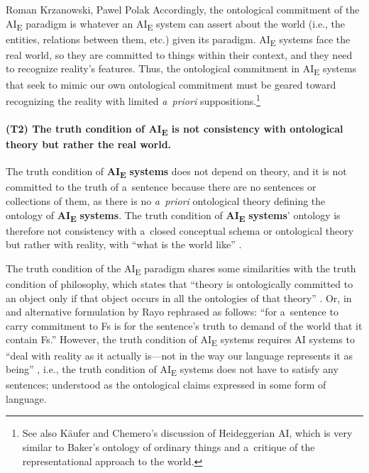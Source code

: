 \begin{artengenv2auth}{Roman Krzanowski, Pawel Polak}
Accordingly, the ontological commitment of the AI\textsubscript{E} paradigm is whatever an AI\textsubscript{E} system can assert about the world (i.e., the entities, relations between them, etc.) given its paradigm. AI\textsubscript{E} systems face the real world, so they are committed to things within their context, and they need to recognize reality's features. Thus, the ontological commitment in AI\textsubscript{E} systems that seek to mimic our own ontological commitment must be geared toward recognizing the reality with limited \textit{a~priori} suppositions.\footnote{See also Käufer and Chemero's
\parencite*[][p.220]{kaufer_phenomenology_2021} %
 discussion of Heideggerian AI, which is very similar to Baker's ontology of ordinary things 
\parencite[][]{baker_metaphysics_2007} %
 and a~critique of the representational approach to the world.}

\paragraph{(T2) The truth condition of AI\textsubscript{E} is not consistency with ontological theory but rather the real world.}
The truth condition of \textbf{AI}\textbf{\textsubscript{E}} \textbf{systems} does not depend on theory, and it is not committed to the truth of a~sentence because there are no sentences or collections of them, as there is no \textit{a~priori} ontological theory defining the ontology of \textbf{AI}\textbf{\textsubscript{E}} \textbf{systems}. The truth condition of \textbf{AI}\textbf{\textsubscript{E}} \textbf{systems}' ontology is therefore not consistency with a~closed conceptual schema or ontological theory but rather with reality, with ``what is the world like''
\parencite[][p.57]{smith_promise_2019}.%


The truth condition of the AI\textsubscript{E} paradigm shares some similarities with the truth condition of philosophy, which states that ``theory is ontologically committed to an object only if that object occurs in all the ontologies of that theory''
\parencite[][p.631]{gibson_ontological_2009}. %
 Or, in and alternative formulation by Rayo 
\parencite*[][]{rayo_ontological_2007} %
 rephrased as follows: ``for a~sentence to carry commitment to Fs is for the sentence's truth to demand of the world that it contain Fs.'' However, the truth condition of AI\textsubscript{E} systems requires AI systems to ``deal with reality as it actually is---not in the way our language represents it as being'' 
\parencite[][p.34]{smith_promise_2019}, %
 i.e., the truth condition of AI\textsubscript{E} systems does not have to satisfy any sentences; understood as the ontological claims expressed in some form of language.


\end{artengenv2auth}
